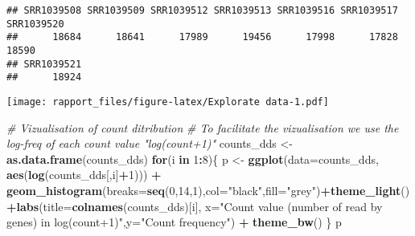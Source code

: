 \documentclass[]{article}
\newenvironment{Shaded}{\begin{snugshade}}{\end{snugshade}}
\newcommand{\KeywordTok}[1]{\textcolor[rgb]{0.13,0.29,0.53}{\textbf{#1}}}
\newcommand{\DataTypeTok}[1]{\textcolor[rgb]{0.13,0.29,0.53}{#1}}
\newcommand{\DecValTok}[1]{\textcolor[rgb]{0.00,0.00,0.81}{#1}}
\newcommand{\StringTok}[1]{\textcolor[rgb]{0.31,0.60,0.02}{#1}}
\newcommand{\CommentTok}[1]{\textcolor[rgb]{0.56,0.35,0.01}{\textit{#1}}}
\newcommand{\ControlFlowTok}[1]{\textcolor[rgb]{0.13,0.29,0.53}{\textbf{#1}}}
\newcommand{\OperatorTok}[1]{\textcolor[rgb]{0.81,0.36,0.00}{\textbf{#1}}}
\newcommand{\NormalTok}[1]{#1}
\begin{document}
\begin{verbatim}
## SRR1039508 SRR1039509 SRR1039512 SRR1039513 SRR1039516 SRR1039517 SRR1039520 
##      18684      18641      17989      19456      17998      17828      18590 
## SRR1039521 
##      18924
\end{verbatim}

\begin{Shaded}
\end{Shaded}

\texttt{[image: rapport\_files/figure-latex/Explorate data-1.pdf]}

\begin{Shaded}
\begin{Highlighting}[]
\CommentTok{# Vizualisation of count ditribution}
\CommentTok{# To facilitate the vizualisation we use the log-freq of each count value "log(count+1)"}
\NormalTok{counts_dds <-}\KeywordTok{as.data.frame}\NormalTok{(counts_dds)}
\ControlFlowTok{for}\NormalTok{(i }\ControlFlowTok{in} \DecValTok{1}\OperatorTok{:}\DecValTok{8}\NormalTok{)\{}
\NormalTok{ p <-}\StringTok{ }\KeywordTok{ggplot}\NormalTok{(}\DataTypeTok{data=}\NormalTok{counts_dds, }\KeywordTok{aes}\NormalTok{(}\KeywordTok{log}\NormalTok{(counts_dds[,i]}\OperatorTok{+}\DecValTok{1}\NormalTok{))) }\OperatorTok{+}\StringTok{ }\KeywordTok{geom_histogram}\NormalTok{(}\DataTypeTok{breaks=}\KeywordTok{seq}\NormalTok{(}\DecValTok{0}\NormalTok{,}\DecValTok{14}\NormalTok{,}\DecValTok{1}\NormalTok{),}\DataTypeTok{col=}\StringTok{"black"}\NormalTok{,}\DataTypeTok{fill=}\StringTok{"grey"}\NormalTok{)}\OperatorTok{+}\KeywordTok{theme_light}\NormalTok{()}\OperatorTok{+}\KeywordTok{labs}\NormalTok{(}\DataTypeTok{title=}\KeywordTok{colnames}\NormalTok{(counts_dds)[i], }\DataTypeTok{x=}\StringTok{"Count value (number of read by genes) in log(count+1)"}\NormalTok{,}\DataTypeTok{y=}\StringTok{"Count frequency"}\NormalTok{) }\OperatorTok{+}\StringTok{ }\KeywordTok{theme_bw}\NormalTok{()}
\NormalTok{\}}
\NormalTok{p}
\end{Highlighting}
\end{Shaded}
\end{document}
